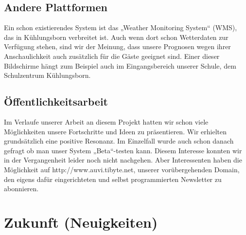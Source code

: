 \documentclass[a4paper,oneside,12pt,titlepage]{article}
\begin{document}
    \subsection{Andere Plattformen}
        Ein schon existierendes System ist das „Weather Monitoring System“ (WMS), das in Kühlungsborn verbreitet ist. Auch wenn dort schon Wetterdaten zur Verfügung stehen, sind wir der Meinung, dass unsere Prognosen wegen ihrer Anschaulichkeit auch zusätzlich für die Gäste geeignet sind. Einer dieser Bildschirme hängt zum Beispiel auch im Eingangsbereich unserer Schule, dem Schulzentrum Kühlungsborn.

    \subsection{Öffentlichkeitsarbeit}
        Im Verlaufe unserer Arbeit an diesem Projekt hatten wir schon viele Möglichkeiten unsere Fortschritte und Ideen zu präsentieren. Wir erhielten grundsätzlich eine positive Resonanz. Im Einzelfall wurde auch schon danach gefragt ob man unser System „Beta“-testen kann. Diesem Interesse konnten wir in der Vergangenheit leider noch nicht nachgehen. Aber Interessenten haben die Möglichkeit auf http://www.auvi.tibyte.net, unserer vorübergehenden Domain, den eigens dafür eingerichteten und selbst programmierten Newsletter zu abonnieren.  
        
\section{Zukunft (Neuigkeiten)}
\end{document}
